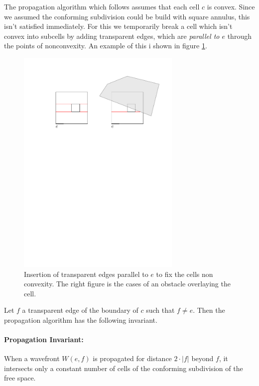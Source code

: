 The propagation algorithm which follows assumes that each cell $c$ is convex. Since we assumed the 
conforming subdivision could be build with square annulus, this isn't satisfied immediately. For this we 
temporarily break a cell which isn't convex into subcells by adding transparent edges, which are 
\textit{parallel to $e$} through the points of nonconvexity. An example of this i shown in figure 
\ref{fig:preparingcells}.

\begin{figure}[H]
	\centering
	\includegraphics[width=0.7\textwidth]{figures/preparingcells.pdf}
	\caption{Insertion of transparent edges parallel to $e$ to fix the cells non convexity. The right 
    		 figure is the cases of an obstacle overlaying the cell.}
	\label{fig:preparingcells}
\end{figure}

Let $f$ a transparent edge of the boundary of $c$ such that $f \neq e$. Then the propagation algorithm has 
the following invariant.

\paragraph{Propagation Invariant:} When a wavefront $W(e,f)$ is propagated for distance $2 \cdot | f |$
           beyond $f$, it intersects only a constant number of cells of the conforming subdivision 
           of the free space.  \\

